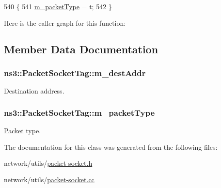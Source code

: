 \begin{DoxyCode}
540 \{
541   \hyperlink{classns3_1_1PacketSocketTag_a91dc92f154c3804f200f9913b3e0dda5}{m\_packetType} = t;
542 \}
\end{DoxyCode}


Here is the caller graph for this function\+:




\subsection{Member Data Documentation}
\subsubsection[{\texorpdfstring{m\+\_\+dest\+Addr}{m_destAddr}}]{ ns3\+::\+Packet\+Socket\+Tag\+::m\+\_\+dest\+Addr\hspace{0.3cm}{\ttfamily [private]}}\hypertarget{classns3_1_1PacketSocketTag_a1d4aa81ebe0c6ec44dc76f10d2e0a255}{}\label{classns3_1_1PacketSocketTag_a1d4aa81ebe0c6ec44dc76f10d2e0a255}


Destination address. 

\subsubsection[{\texorpdfstring{m\+\_\+packet\+Type}{m_packetType}}]{ ns3\+::\+Packet\+Socket\+Tag\+::m\+\_\+packet\+Type\hspace{0.3cm}{\ttfamily [private]}}\hypertarget{classns3_1_1PacketSocketTag_a91dc92f154c3804f200f9913b3e0dda5}{}\label{classns3_1_1PacketSocketTag_a91dc92f154c3804f200f9913b3e0dda5}


\hyperlink{classns3_1_1Packet}{Packet} type. 



The documentation for this class was generated from the following files\+:\begin{DoxyCompactItemize}
\item 
network/utils/\hyperlink{packet-socket_8h}{packet-\/socket.\+h}\item 
network/utils/\hyperlink{packet-socket_8cc}{packet-\/socket.\+cc}\end{DoxyCompactItemize}
